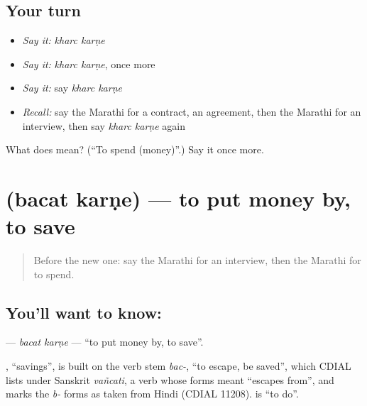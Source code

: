 \subsection*{Your turn}
\begin{itemize}
\raggedright
  \item \emph{Say it:} \emph{kharc karṇe}
  \item \emph{Say it:} \emph{kharc karṇe}, once more
  \item \emph{Say it:} say \emph{kharc karṇe}
  \item \emph{Recall:} say the Marathi for a contract, an agreement, then the Marathi for an interview, then say \emph{kharc karṇe} again
\end{itemize}

\begin{tcolorbox}[breakable,colback=teal!4,colframe=teal!35!black,title={Before you move on}]
What does   mean? (\textquotedblleft{}To spend (money)\textquotedblright{}.) Say it once more.
\end{tcolorbox}
\section[\texorpdfstring{\mr{बचत} \mr{करणे} (bacat karṇe)}{बचत करणे (bacat karṇe)}]{  (bacat karṇe) — to put money by, to save}

\label{lesson:MR-C193-bacat-karne}



\begin{quote}
Before the new one: say the Marathi for an interview, then the Marathi for to spend.
\end{quote}

\subsection*{You'll want to know:  }
\textbf{ } — \emph{bacat karṇe} — \textquotedblleft{}to put money by, to save\textquotedblright{}.

\begin{cousinweb}
\textbf{}, \textquotedblleft{}savings\textquotedblright{}, is built on the verb stem \emph{bac-}, \textquotedblleft{}to escape, be saved\textquotedblright{}, which CDIAL lists under Sanskrit \emph{vañcati}, a verb whose forms meant \textquotedblleft{}escapes from\textquotedblright{}, and marks the \emph{b-} forms as taken from Hindi (CDIAL 11208). \textbf{} is \textquotedblleft{}to do\textquotedblright{}.
\end{cousinweb}

